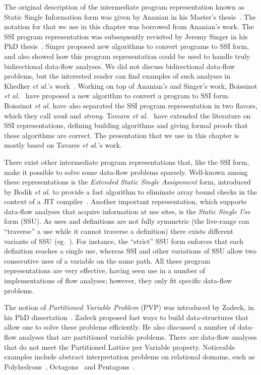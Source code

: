 The original description of the intermediate program representation known as Static Single Information form was given by Ananian in his Master's thesis~\cite{Ananian99}.
The notation for \sigmafuns that we use in this chapter was borrowed from Ananian's work.
The SSI program representation was subsequently revisited by Jeremy Singer in his PhD thesis~\cite{Singer06}.
Singer proposed new algorithms to convert programs to SSI form, and also showed how this program representation could be used to handle truly bidirectional data-flow analyses.
We did not discuss bidirectional data-flow problems, but the interested reader can find examples of such analyses in Khedker {\em et al.}'s work~\cite{Khedker99}.
Working on top of Ananian's and Singer's work, Boissinot {\em et al.}~\cite{BoissinotBDR12} have proposed a new algorithm to convert a program to SSI form.
Boissinot {\em et al.} have also separated the SSI program representation in two flavors, which they call {\em weak} and {\em strong}.
Tavares {\em et al.}~\cite{Tavares11b} have extended the literature on SSI representations, defining building algorithms and giving formal proofs that these algorithms are correct.
The presentation that we use in this chapter is mostly based on Tavares {\em et
al.}'s work.

There exist other intermediate program representations that, like the SSI form, make it possible to solve some data-flow problems sparsely.
Well-known among these representations is the {\em Extended Static Single Assignment} form, introduced by Bodik {\em et al.} to provide a fast algorithm to eliminate array bound checks in the context of a JIT compiler~\cite{Bodik00}.
Another important representation, which supports data-flow analyses that acquire information at use sites, is the \emph{Static Single Use} form (SSU).
As uses and definitions are not fully symmetric (the live-range can ``traverse'' a use while it cannot traverse a definition) there exists different variants of SSU (eg.~\cite{Plevyak96,George03-IXP,Lo98_registerPromotion}).
For instance, the ``strict'' SSU form enforces that each definition reaches a
single use, whereas SSI and other variations of SSU allow two consecutive uses
of a variable on the same path.
All these program representations are very effective, having seen use in a number of implementations of flow analyses; however, they only fit specific data-flow problems.

The notion of {\em Partitioned Variable Problem} (PVP) was introduced by Zadeck, in his PhD dissertation~\cite{Zadeck84}.
Zadeck proposed fast ways to build data-structures that allow one to solve these problems efficiently.
He also discussed a number of data-flow analyses that are partitioned variable problems.
There are data-flow analyses that do not meet the Partitioned Lattice per Variable property.
Noticeable examples include abstract interpretation problems on relational domains, such as Polyhedrons~\cite{Cousot78}, Octagons~\cite{Mine06} and Pentagons~\cite{Logozzo08}.

